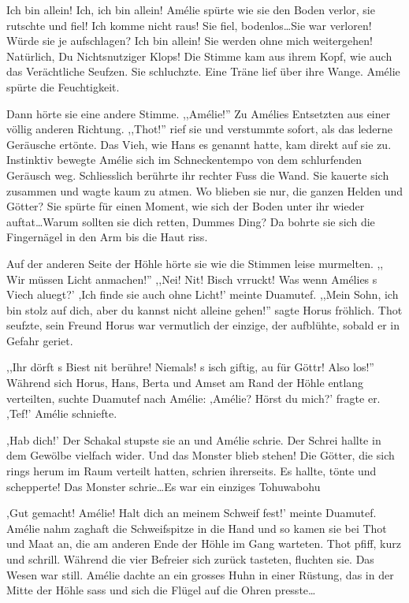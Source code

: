\documentclass[11pt,titlepage,a5paper]{book}
\begin{document}
Ich bin allein! Ich, ich bin allein! Amélie spürte wie sie den Boden verlor, sie rutschte und fiel! Ich komme nicht raus! Sie fiel, bodenlos\dots Sie war verloren! Würde sie je aufschlagen? Ich bin allein! Sie werden ohne mich weitergehen! Natürlich, Du Nichtsnutziger Klops! Die Stimme kam aus ihrem Kopf, wie auch das Verächtliche Seufzen. Sie schluchzte. Eine Träne lief über ihre Wange. Amélie spürte die Feuchtigkeit. 


Dann hörte sie eine andere Stimme. ,,Amélie!'' Zu Amélies Entsetzten aus einer völlig anderen Richtung. ,,Thot!'' rief sie und verstummte sofort, als das lederne Geräusche ertönte. Das Vieh, wie Hans es genannt hatte, kam direkt auf sie zu. Instinktiv bewegte Amélie sich im Schneckentempo von dem schlurfenden Geräusch weg. Schliesslich berührte ihr rechter Fuss die Wand. Sie kauerte sich zusammen und wagte kaum zu atmen. Wo blieben sie nur, die ganzen Helden und Götter? Sie spürte für einen Moment, wie sich der Boden unter ihr wieder auftat\dots Warum sollten sie dich retten, Dummes Ding? Da bohrte sie sich die Fingernägel in den Arm bis die Haut riss.

Auf der anderen Seite der Höhle hörte sie wie die Stimmen leise murmelten. ,, Wir müssen Licht anmachen!'' ,,Nei! Nit! Bisch vrruckt! Was wenn Amélies s Viech aluegt?' ,Ich finde sie auch ohne Licht!' meinte Duamutef. ,,Mein Sohn, ich bin stolz auf dich, aber du kannst nicht alleine gehen!'' sagte Horus fröhlich. Thot seufzte, sein Freund Horus war vermutlich der einzige, der aufblühte, sobald er in Gefahr geriet.

,,Ihr dörft s Biest nit berühre! Niemals! s isch giftig, au für Göttr! Also los!'' Während sich Horus, Hans, Berta und Amset am Rand der Höhle entlang verteilten, suchte Duamutef nach Amélie: ,Amélie? Hörst du mich?' fragte er. ,Tef!' Amélie schniefte. 

,Hab dich!' Der Schakal stupste sie an und Amélie schrie. Der Schrei hallte in dem Gewölbe vielfach wider. Und das Monster blieb stehen! Die Götter, die sich rings herum im Raum verteilt hatten, schrien ihrerseits. Es hallte, tönte und schepperte! Das Monster schrie\dots Es war ein einziges Tohuwabohu

,Gut gemacht! Amélie! Halt dich an meinem Schweif fest!' meinte Duamutef. Amélie nahm zaghaft die Schweifspitze in die Hand und so kamen sie bei Thot und Maat an, die am anderen Ende der Höhle im Gang warteten. Thot pfiff, kurz und schrill. Während die vier Befreier sich zurück tasteten, fluchten sie. Das Wesen war still. Amélie dachte an ein grosses Huhn in einer Rüstung, das in der Mitte der Höhle sass und sich die Flügel auf die Ohren presste\dots 
\end{document}
